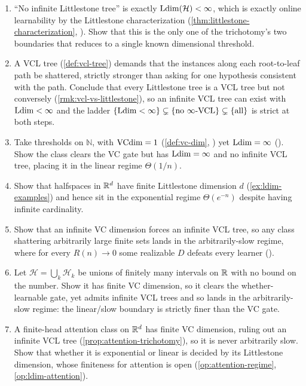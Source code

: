 \begin{enumerate}[leftmargin=*,itemsep=3pt]
\item ``No infinite Littlestone tree'' is exactly $\mathrm{Ldim}(\mathcal{H}) < \infty$, which is exactly online learnability by the Littlestone characterization (\cref{thm:littlestone-characterization}, ). Show that this is the only one of the trichotomy's two boundaries that reduces to a single known dimensional threshold.

\item A VCL tree (\cref{def:vcl-tree}) demands that the instances along each root-to-leaf path be shattered, strictly stronger than asking for one hypothesis consistent with the path. Conclude that every Littlestone tree is a VCL tree but not conversely (\cref{rmk:vcl-vs-littlestone}), so an infinite VCL tree can exist with $\mathrm{Ldim} < \infty$ and the ladder $\{\mathrm{Ldim}<\infty\} \subsetneq \{\text{no }\infty\text{-VCL}\} \subsetneq \{\text{all}\}$ is strict at both steps.

\item Take thresholds on $\mathbb{N}$, with $\mathrm{VCdim} = 1$ (\cref{def:vc-dim}, ) yet $\mathrm{Ldim} = \infty$ (). Show the class clears the VC gate but has $\mathrm{Ldim} = \infty$ and no infinite VCL tree, placing it in the linear regime $\Theta(1/n)$.

\item Show that halfspaces in $\mathbb{R}^d$ have finite Littlestone dimension $d$ (\cref{ex:ldim-examples}) and hence sit in the exponential regime $\Theta(e^{-n})$ despite having infinite cardinality.

\item Show that an infinite VC dimension forces an infinite VCL tree, so any class shattering arbitrarily large finite sets lands in the arbitrarily-slow regime, where for every $R(n)\to 0$ some realizable $D$ defeats every learner (\cite{BousquetHannekeMoranVanHandelYehudayoff2021}).

\item Let $\mathcal{H} = \bigcup_k \mathcal{H}_k$ be unions of finitely many intervals on $\mathbb{R}$ with no bound on the number. Show it has finite VC dimension, so it clears the whether-learnable gate, yet admits infinite VCL trees and so lands in the arbitrarily-slow regime: the linear/slow boundary is strictly finer than the VC gate.

\item A finite-head attention class on $\mathbb{R}^d$ has finite VC dimension, ruling out an infinite VCL tree (\cref{prop:attention-trichotomy}), so it is never arbitrarily slow. Show that whether it is exponential or linear is decided by its Littlestone dimension, whose finiteness for attention is open (\cref{op:attention-regime}, \cref{op:ldim-attention}).


\end{enumerate}
